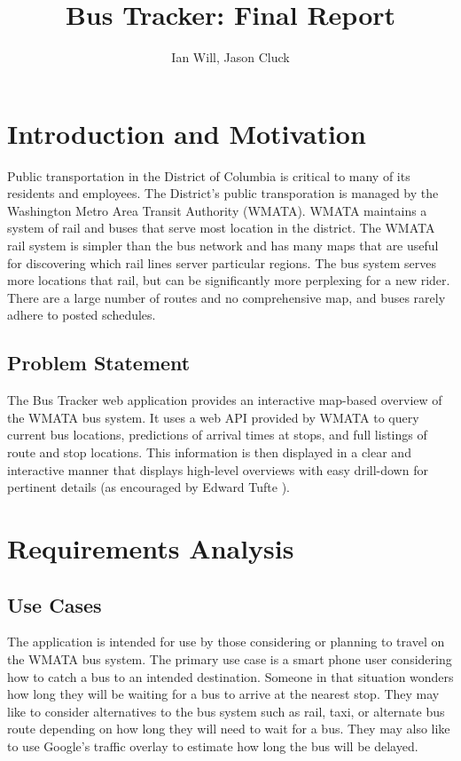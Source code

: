 \documentclass[12pt]{report}
\title{Bus Tracker: Final Report}
\author{Ian Will, Jason Cluck}
\date{}
\begin{document}
\maketitle

\tableofcontents
\listoffigures

\chapter{Introduction and Motivation}

  Public transportation in the District of Columbia is critical to many of its residents and employees.  The District's public transporation is managed by the Washington Metro Area Transit Authority (WMATA).  WMATA maintains a system of rail and buses that serve most location in the district.  The WMATA rail system is simpler than the bus network and has many maps that are useful for discovering which rail lines server particular regions.  The bus system serves more locations that rail, but can be significantly more perplexing for a new rider.  There are a large number of routes and no comprehensive map, and buses rarely adhere to posted schedules.

\section{Problem Statement}

The Bus Tracker web application provides an interactive map-based overview of the WMATA bus system.  It uses a web API provided by  WMATA to query current bus locations, predictions of arrival times at stops, and full listings of route and stop locations.  This information is then displayed in a clear and interactive manner that displays high-level overviews with easy drill-down for pertinent details (as encouraged by Edward Tufte \cite{tufte:2006}).

\chapter{Requirements Analysis}

\section{Use Cases}

The application is intended for use by those considering or planning to travel on the WMATA bus system.  The primary use case is a smart phone user considering how to catch a bus to an intended destination.  Someone in that situation wonders how long they will be waiting for a bus to arrive at the nearest stop.  They may like to consider alternatives to the bus system such as rail, taxi, or alternate bus route depending on how long they will need to wait for a bus.  They may also like to use Google's traffic overlay to estimate how long the bus will be delayed.
\end{document}

